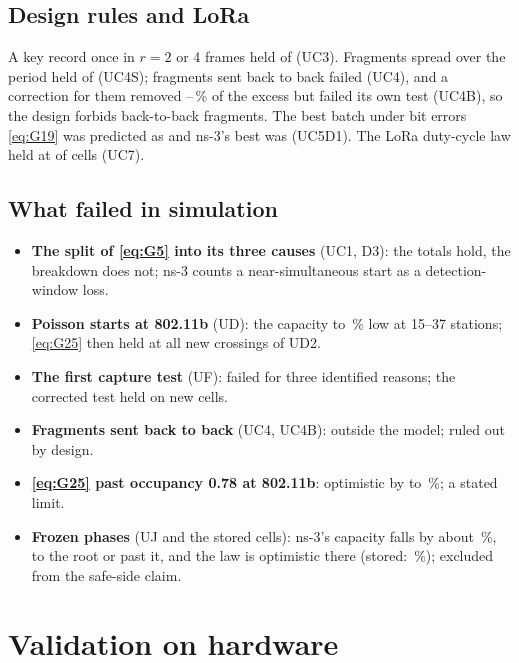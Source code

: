 \documentclass[11pt,a4paper]{article}
\begin{document}
\subsection{Design rules and LoRa}

A key record once in $r=2$ or 4 frames held \ucThreeHeld{} of \ucThreeCells{} (UC3). Fragments spread
over the period held \ucFourSHeld{} of \ucFourSCells{} (UC4S); fragments sent back to back failed
(UC4), and a correction for them removed \burstFixMin--\burstFixMax\,\% of the excess but failed its
own test (UC4B), so the design forbids back-to-back fragments. The best batch under bit errors
\eqref{eq:G19} was predicted as \ucFivePred{} and ns-3's best was \ucFiveBest{} (UC5D1). The LoRa
duty-cycle law held at \lrHeld{} of \lrCells{} cells (UC7).

\subsection{What failed in simulation}

\begin{itemize}
\item \textbf{The split of \eqref{eq:G5} into its three causes} (UC1, D3): the totals hold, the
breakdown does not; ns-3 counts a near-simultaneous start as a detection-window loss.
\item \textbf{Poisson starts at 802.11b} (UD): the capacity \udDRootMax{} to \udDRootMin\,\% low at
15--37 stations; \eqref{eq:G25} then held at all \udQCrossings{} new crossings of UD2.
\item \textbf{The first capture test} (UF): failed for three identified reasons; the corrected test
held on new cells.
\item \textbf{Fragments sent back to back} (UC4, UC4B): outside the model; ruled out by design.
\item \textbf{\eqref{eq:G25} past occupancy 0.78 at 802.11b}: optimistic by \uhMin{} to \uhMax\,\%;
a stated limit.
\item \textbf{Frozen phases} (UJ and the stored cells): ns-3's capacity falls by about
\ujFzDrop\,\%, to the root or past it, and the law is optimistic there (stored: \scLawOptErr\,\%);
excluded from the safe-side claim.
\end{itemize}

\section{Validation on hardware}\label{sec:hw}
\end{document}
